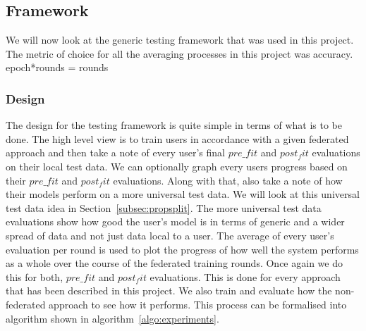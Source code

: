 \documentclass[12pt]{article}
\begin{document}
\subsection{Framework}\label{subsec:framework}
We will now look at the generic testing framework that was used in this project. The metric of choice for all the averaging processes in this project was accuracy. 
epoch*rounds = rounds

\subsubsection{Design}
The design for the testing framework is quite simple in terms of what is to be done. The high level view is to train users in accordance with a given federated approach and then take a note of every user's final $pre\_fit$ and $post_fit$ evaluations on their local test data. We can optionally graph every users progress based on their $pre\_fit$ and $post_fit$ evaluations. Along with that, also take a note of how their models perform on a more universal test data. We will look at this universal test data idea in Section~\ref{subsec:propsplit}. The more universal test data evaluations show how good the user's model is in terms of generic and a wider spread of data and not just data local to a user. The average of every user's evaluation per round is used to plot the progress of how well the system performs as a whole over the course of the federated training rounds. Once again we do this for both, $pre\_fit$ and $post_fit$ evaluations. This is done for every approach that has been described in this project. We also train and evaluate how the non-federated approach to see how it performs. This process can be formalised into algorithm shown in algorithm~\ref{algo:experiments}.
\end{document}
